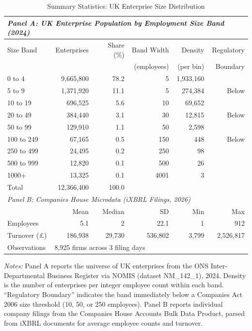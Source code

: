 \begin{table}[htbp]
\centering
\caption{Summary Statistics: UK Enterprise Size Distribution}
\label{tab:summary}
\begin{threeparttable}
\begin{tabular}{lrrrrr}
\toprule
\multicolumn{6}{l}{\textit{Panel A: UK Enterprise Population by Employment Size Band (2024)}} \\
\midrule
Size Band & Enterprises & Share (\%) & Band Width & Density & Regulatory \\
 & & & (employees) & (per bin) & Boundary \\
\midrule
0 to 4 & 9,665,800 & 78.2 & 5 & 1,933,160 &  \\
5 to 9 & 1,371,920 & 11.1 & 5 & 274,384 & Below \\
10 to 19 & 696,525 & 5.6 & 10 & 69,652 &  \\
20 to 49 & 384,440 & 3.1 & 30 & 12,815 & Below \\
50 to 99 & 129,910 & 1.1 & 50 & 2,598 &  \\
100 to 249 & 67,165 & 0.5 & 150 & 448 & Below \\
250 to 499 & 24,495 & 0.2 & 250 & 98 &  \\
500 to 999 & 12,820 & 0.1 & 500 & 26 &  \\
1000+ & 13,325 & 0.1 & 4001 & 3 &  \\
\midrule
Total & 12,366,400 & 100.0 & & & \\
\midrule
\multicolumn{6}{l}{\textit{Panel B: Companies House Microdata (iXBRL Filings, 2026)}} \\
\midrule
& Mean & Median & SD & Min & Max \\
\midrule
Employees & 5.1 & 2 & 22.1 & 1 & 912 \\
Turnover (\pounds) & 186,938 & 29,730 & 536,802 & 3,799 & 2,526,817 \\
\midrule
Observations & \multicolumn{5}{l}{8,925 firms across 3 filing days} \\
\bottomrule
\end{tabular}
\begin{tablenotes}[flushleft]
\small
\item \textit{Notes:} Panel A reports the universe of UK enterprises from the ONS Inter-Departmental
Business Register via NOMIS (dataset NM\_142\_1), 2024. Density is the number of enterprises per
integer employee count within each band. ``Regulatory Boundary'' indicates the band immediately
below a Companies Act 2006 size threshold (10, 50, or 250 employees). Panel B reports individual
company filings from the Companies House Accounts Bulk Data Product, parsed from iXBRL documents
for average employee counts and turnover.
\end{tablenotes}
\end{threeparttable}
\end{table}

